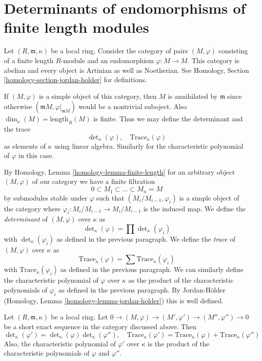 \section{Determinants of endomorphisms of finite length modules}
\label{section-determinants-finite-length}

\noindent
Let $(R, \mathfrak m, \kappa)$ be a local ring. Consider the category
of pairs $(M, \varphi)$ consisting of a finite length $R$-module
and an endomorphism $\varphi : M \to M$. This category is abelian
and every object is Artinian as well as Noetherian. See
Homology, Section \ref{homology-section-jordan-holder}
for definitions.

\medskip\noindent
If $(M, \varphi)$ is a simple object of this category, then
$M$ is annihilated by $\mathfrak m$ since otherwise
$(\mathfrak m M, \varphi|_{\mathfrak m M})$
would be a nontrivial suboject. Also $\dim_\kappa(M) = \text{length}_R(M)$
is finite. Thus we may define the determinant and the trace
$$
\det\nolimits_\kappa(\varphi),\quad \text{Trace}_\kappa(\varphi)
$$
as elements of $\kappa$
using linear algebra. Similarly for
the characteristic polynomial of $\varphi$ in this case.

\medskip\noindent
By Homology, Lemma \ref{homology-lemma-finite-length} for an arbitrary object
$(M, \varphi)$ of our category we have a finite filtration
$$
0 \subset M_1 \subset \ldots \subset M_n = M
$$
by submodules stable under $\varphi$ such that
$(M_i/M_{i - 1}, \varphi_i)$ is a simple object of the category
where $\varphi_i : M_i/M_{i - 1} \to M_i/M_{i - 1}$
is the induced map. We define the {\it determinant} of $(M, \varphi)$
over $\kappa$ as
$$
\det\nolimits_\kappa(\varphi) = \prod \det\nolimits_\kappa(\varphi_i)
$$
with $\det_\kappa(\varphi_i)$ as defined in the previous paragraph.
We define the {\it trace} of $(M, \varphi)$ over $\kappa$ as
$$
\text{Trace}_\kappa(\varphi) = \sum \text{Trace}_\kappa(\varphi_i)
$$
with $\text{Trace}_\kappa(\varphi_i)$ as defined in the previous paragraph.
We can similarly define the characteristic polynomial of $\varphi$
over $\kappa$ as the product of the characteristic polynomials
of $\varphi_i$ as defined in the previous paragraph. By Jordan-H\"older
(Homology, Lemma \ref{homology-lemma-jordan-holder})
this is well defined.

\begin{lemma}
\label{lemma-ses}
Let $(R, \mathfrak m, \kappa)$ be a local ring.
Let $0 \to (M, \varphi) \to (M', \varphi') \to (M'', \varphi'') \to 0$
be a short exact sequence in the category discussed above.
Then
$$
\det\nolimits_\kappa(\varphi') =
\det\nolimits_\kappa(\varphi)\det\nolimits_\kappa(\varphi''),\quad
\text{Trace}_\kappa(\varphi') = \text{Trace}_\kappa(\varphi) + 
\text{Trace}_\kappa(\varphi'')
$$
Also, the characteristic polynomial
of $\varphi'$ over $\kappa$ is the product of the characteristic polynomials
of $\varphi$ and $\varphi''$.
\end{lemma}

